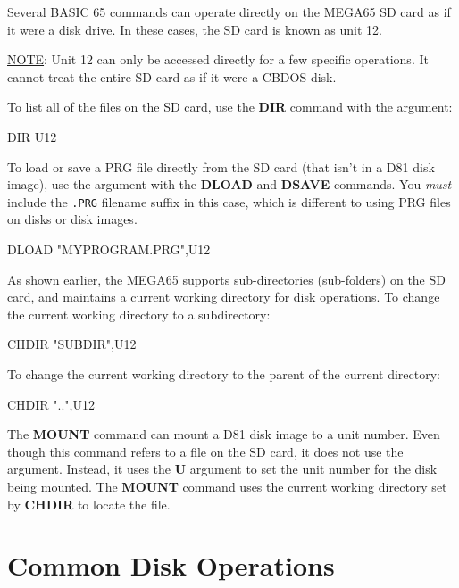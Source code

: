 Several BASIC 65 commands can operate directly on the MEGA65 SD card as if it were a disk drive. In these cases, the SD card is known as unit 12.

\underline{NOTE}: Unit 12 can only be accessed directly for a few specific operations. It cannot treat the entire SD card as if it were a CBDOS disk.

To list all of the files on the SD card, use the {\bf DIR} command with the  argument:

\begin{screenoutput}
DIR U12
\end{screenoutput}

To load or save a PRG file directly from the SD card (that isn't in a D81 disk image), use the  argument with the {\bf DLOAD} and {\bf DSAVE} commands. You {\em must} include the {\tt .PRG} filename suffix in this case, which is different to using PRG files on disks or disk images.

\begin{screenoutput}
DLOAD "MYPROGRAM.PRG",U12
\end{screenoutput}

As shown earlier, the MEGA65 supports sub-directories (sub-folders) on the SD card, and maintains a current working directory for disk operations. To change the current working directory to a subdirectory:

\begin{screenoutput}
CHDIR "SUBDIR",U12
\end{screenoutput}

To change the current working directory to the parent of the current directory:

\begin{screenoutput}
CHDIR "..",U12
\end{screenoutput}

The {\bf MOUNT} command can mount a D81 disk image to a unit number. Even though this command refers to a file on the SD card, it does not use the  argument. Instead, it uses the {\bf U} argument to set the unit number for the disk being mounted. The {\bf MOUNT} command uses the current working directory set by {\bf CHDIR} to locate the file.


\section{Common Disk Operations}

